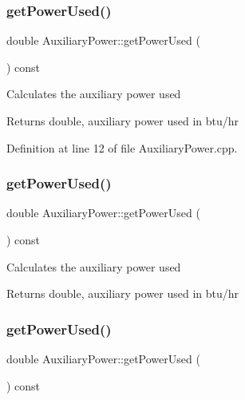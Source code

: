 \subsubsection{\texorpdfstring{get\+Power\+Used()}{getPowerUsed()}\hspace{0.1cm}{\footnotesize\ttfamily [1/3]}}
{\footnotesize\ttfamily double Auxiliary\+Power\+::get\+Power\+Used (\begin{DoxyParamCaption}{ }\end{DoxyParamCaption}) const}

Calculates the auxiliary power used

\begin{DoxyReturn}{Returns}
double, auxiliary power used in btu/hr 
\end{DoxyReturn}


Definition at line 12 of file Auxiliary\+Power.\+cpp.

\mbox{\label{class_auxiliary_power_a824ece4e6bb789fceb1b55ecf2f678bd}} 
\subsubsection{\texorpdfstring{get\+Power\+Used()}{getPowerUsed()}\hspace{0.1cm}{\footnotesize\ttfamily [2/3]}}
{\footnotesize\ttfamily double Auxiliary\+Power\+::get\+Power\+Used (\begin{DoxyParamCaption}{ }\end{DoxyParamCaption}) const}

Calculates the auxiliary power used

\begin{DoxyReturn}{Returns}
double, auxiliary power used in btu/hr 
\end{DoxyReturn}
\mbox{\label{class_auxiliary_power_a824ece4e6bb789fceb1b55ecf2f678bd}} 
\subsubsection{\texorpdfstring{get\+Power\+Used()}{getPowerUsed()}\hspace{0.1cm}{\footnotesize\ttfamily [3/3]}}
{\footnotesize\ttfamily double Auxiliary\+Power\+::get\+Power\+Used (\begin{DoxyParamCaption}{ }\end{DoxyParamCaption}) const}

